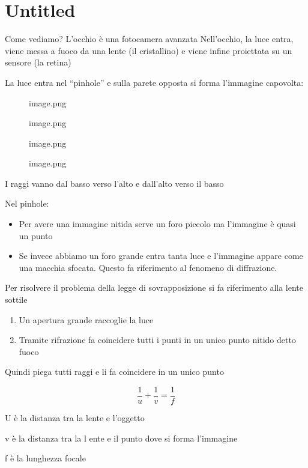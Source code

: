 \documentclass[
]{article}
\author{}
\date{}
\providecommand{\tightlist}{%
  \setlength{\itemsep}{0pt}\setlength{\parskip}{0pt}}
\begin{document}
\hypertarget{untitled}{%
\section{Untitled}\label{untitled}}

Come vediamo? L'occhio è una fotocamera avanzata
Nell'occhio, la luce entra, viene messa a fuoco da una lente (il cristallino) e viene infine proiettata su un sensore (la retina)

La luce entra nel ``pinhole'' e sulla parete opposta si forma l'immagine capovolta:

\begin{figure}
\centering
{image.png}
\caption{image.png}
\end{figure}

\begin{figure}
\centering
{image.png}
\caption{image.png}
\end{figure}

I raggi vanno dal basso verso l'alto e dall'alto verso il basso

Nel pinhole:

\begin{itemize}
\tightlist
\item
  Per avere una immagine nitida serve un foro piccolo ma l'immagine è quasi un punto
\item
  Se invece abbiamo un foro grande entra tanta luce e l'immagine appare come una macchia sfocata. Questo fa riferimento al fenomeno di diffrazione.
\end{itemize}

Per risolvere il problema della legge di sovrapposizione si fa riferimento alla lente sottile

\begin{enumerate}
\def\labelenumi{\arabic{enumi}.}
\tightlist
\item
  Un apertura grande raccoglie la luce
\item
  Tramite rifrazione fa coincidere tutti i punti in un unico punto nitido detto fuoco
\end{enumerate}

Quindi piega tutti raggi e li fa coincidere in un unico punto

\[
\frac{1}{u} + \frac{1}{v} = \frac{1}{f}
\]

U è la distanza tra la lente e l'oggetto

v è la distanza tra la l ente e il punto dove si forma l'immagine

f è la lunghezza focale
\end{document}
